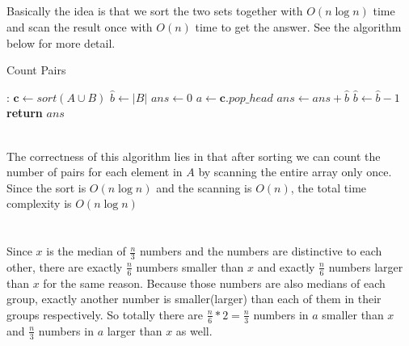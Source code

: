 \documentclass[12pt,letterpaper]{article}
\begin{document}
\subsection{}
Basically the idea is that we sort the two sets together with $O(n\log n)$ time and scan the result once with $O(n)$ time to get the answer. See the algorithm below for more detail.
\begin{algorithm}
    \caption{Count Pairs}\label{alg:count}
    \begin{algorithmic}[1]
    :
    \State $\boldsymbol{c}\gets sort(A\cup B)$
    \State $\hat{b}\gets |B|$
    \State $ans\gets 0$
    \State $a\gets\boldsymbol{c}.pop\_head$
    \State $ans\gets ans+\hat{b}$
    \EndIf
    \State $\hat{b}\gets \hat{b}-1$
    \EndIf
    \EndWhile
    \State \textbf{return} $ans$
    \EndProcedure
    \end{algorithmic}
\end{algorithm}\\
The correctness of this algorithm lies in that after sorting we can count the number of pairs for each element in $A$ by scanning the entire array only once. Since the sort is $O(n\log n)$ and the scanning is $O(n)$, the total time complexity is $O(n\log n)$
\subsection{}

\subsection{}
\section{}
\subsection{}
Since $x$ is the median of $\frac{n}{3}$ numbers and the numbers are distinctive to each other, there are exactly $\frac{n}{6}$ numbers smaller than $x$ and exactly $\frac{n}{6}$ numbers larger than $x$ for the same reason. Because those numbers are also medians of each group, exactly another number is smaller(larger) than each of them in their groups respectively. So totally there are $\frac{n}{6}*2=\frac{n}{3}$ numbers in $a$ smaller than $x$ and $\frac{n}{3}$ numbers in $a$ larger than $x$ as well. 
\end{document}
